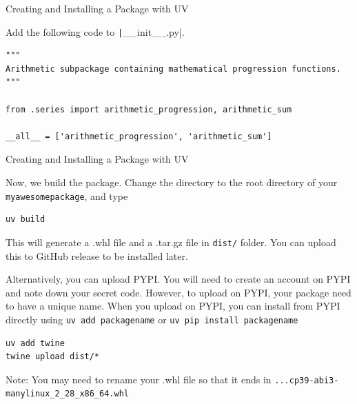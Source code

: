 \documentclass[aspectratio=169,xcolor=dvipsnames,svgnames,x11names,fleqn]{beamer}
\begin{document}
\begin{frame}[containsverbatim]{Creating and Installing a Package with UV}

Add the following code to \texttt|__init__.py|.

\begin{verbatim}
"""
Arithmetic subpackage containing mathematical progression functions.
"""

from .series import arithmetic_progression, arithmetic_sum

__all__ = ['arithmetic_progression', 'arithmetic_sum']

    \end{verbatim}

\end{frame}

\begin{frame}[containsverbatim]{Creating and Installing a Package with UV}

    \footnotesize

Now, we build the package. Change the directory to the root directory of your \texttt{myawesomepackage}, and type 

\begin{verbatim}
uv build
\end{verbatim}
    
This will generate a .whl file and a .tar.gz file in \texttt{dist/} folder. You can upload this to GitHub release to be installed later.

Alternatively, you can upload PYPI. You will need to create an account on PYPI and note down your secret code. However, to upload on PYPI, your package need to have a unique name. When you upload on PYPI, you can install from PYPI directly using \texttt{uv add packagename} or \texttt{uv pip install packagename}

\begin{verbatim}
uv add twine
twine upload dist/*
\end{verbatim}

\begin{tblock}{Note:}
    You may need to rename your .whl file so that it ends in \texttt{...cp39-abi3-manylinux_2_28_x86_64.whl}
    
\end{tblock}


\end{frame}
\end{document}
